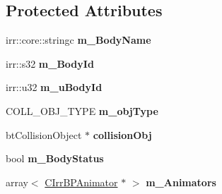 \subsection*{Protected Attributes}
\begin{DoxyCompactItemize}
\item 
\hypertarget{class_c_irr_b_p_collision_object_a50a8a11572aa0de96bef261f3831e6c6}{
irr::core::stringc {\bfseries m\_\-BodyName}}
\label{class_c_irr_b_p_collision_object_a50a8a11572aa0de96bef261f3831e6c6}

\item 
\hypertarget{class_c_irr_b_p_collision_object_acfe99f9cbf6a1bfd3996fed86b3425c3}{
irr::s32 {\bfseries m\_\-BodyId}}
\label{class_c_irr_b_p_collision_object_acfe99f9cbf6a1bfd3996fed86b3425c3}

\item 
\hypertarget{class_c_irr_b_p_collision_object_abcce9b0927be797b5539ca0d2ae7cfc7}{
irr::u32 {\bfseries m\_\-uBodyId}}
\label{class_c_irr_b_p_collision_object_abcce9b0927be797b5539ca0d2ae7cfc7}

\item 
\hypertarget{class_c_irr_b_p_collision_object_a5ae5273cbc9b5c8271e97099826258d1}{
COLL\_\-OBJ\_\-TYPE {\bfseries m\_\-objType}}
\label{class_c_irr_b_p_collision_object_a5ae5273cbc9b5c8271e97099826258d1}

\item 
\hypertarget{class_c_irr_b_p_collision_object_af6ccdd10b4e6bba7c577869664364ecf}{
btCollisionObject $\ast$ {\bfseries collisionObj}}
\label{class_c_irr_b_p_collision_object_af6ccdd10b4e6bba7c577869664364ecf}

\item 
\hypertarget{class_c_irr_b_p_collision_object_a8c90a306e5e358a5243e576add6bf366}{
bool {\bfseries m\_\-BodyStatus}}
\label{class_c_irr_b_p_collision_object_a8c90a306e5e358a5243e576add6bf366}

\item 
\hypertarget{class_c_irr_b_p_collision_object_a5e8e2380befa1bc060854bdf00be9a44}{
array$<$ \hyperlink{class_c_irr_b_p_animator}{CIrrBPAnimator} $\ast$ $>$ {\bfseries m\_\-Animators}}
\label{class_c_irr_b_p_collision_object_a5e8e2380befa1bc060854bdf00be9a44}

\end{DoxyCompactItemize}


